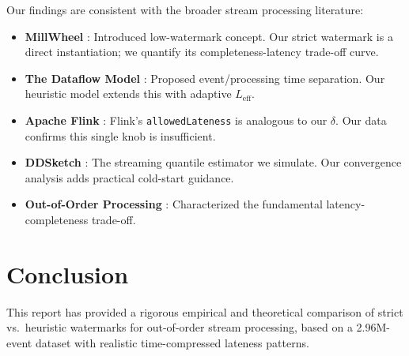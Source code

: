 \documentclass[11pt,a4paper]{article}
\newcommand{\Leff}{L_{\text{eff}}}
\begin{document}
Our findings are consistent with the broader stream processing literature:
\begin{itemize}[leftmargin=*, itemsep=2pt]
  \item \textbf{MillWheel} \cite{akidau2013}: Introduced low-watermark concept. Our strict watermark is a direct instantiation; we quantify its completeness-latency trade-off curve.
  \item \textbf{The Dataflow Model} \cite{akidau2015}: Proposed event/processing time separation. Our heuristic model extends this with adaptive $\Leff$.
  \item \textbf{Apache Flink} \cite{carbone2017}: Flink's \texttt{allowedLateness} is analogous to our $\delta$. Our data confirms this single knob is insufficient.
  \item \textbf{DDSketch} \cite{masson2019}: The streaming quantile estimator we simulate. Our convergence analysis adds practical cold-start guidance.
  \item \textbf{Out-of-Order Processing} \cite{li2008}: Characterized the fundamental latency-completeness trade-off.
\end{itemize}

\section{Conclusion}

This report has provided a rigorous empirical and theoretical comparison of strict vs.\ heuristic watermarks for out-of-order stream processing, based on a 2.96M-event dataset with realistic time-compressed lateness patterns.
\end{document}
